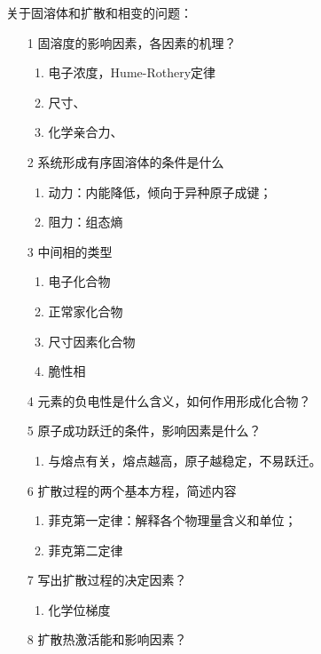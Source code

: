     关于固溶体和扩散和相变的问题：
    \begin{enumerate}
        \item[1] 固溶度的影响因素，各因素的机理？
        \begin{enumerate}
            \item 电子浓度，Hume-Rothery定律
            \item 尺寸、
            \item 化学亲合力、
        \end{enumerate} 
        \item[2] 系统形成有序固溶体的条件是什么
        \begin{enumerate}
            \item 动力：内能降低，倾向于异种原子成键；
            \item 阻力：组态熵
        \end{enumerate} 
        \item[3] 中间相的类型
        \begin{enumerate}
            \item 电子化合物
            \item 正常家化合物
            \item 尺寸因素化合物
            \item 脆性相
        \end{enumerate} 
        \item[4] 元素的负电性是什么含义，如何作用形成化合物？
        \item[5] 原子成功跃迁的条件，影响因素是什么？
        \begin{enumerate}
            \item 与熔点有关，熔点越高，原子越稳定，不易跃迁。
        \end{enumerate} 
        \item[6] 扩散过程的两个基本方程，简述内容
        \begin{enumerate}
            \item 菲克第一定律：解释各个物理量含义和单位；
            \item 菲克第二定律
        \end{enumerate} 
        \item[7] 写出扩散过程的决定因素？
        \begin{enumerate}
            \item 化学位梯度
        \end{enumerate} 
        \item[8] 扩散热激活能和影响因素？
        \begin{enumerate}

\end{enumerate}
\end{enumerate}
